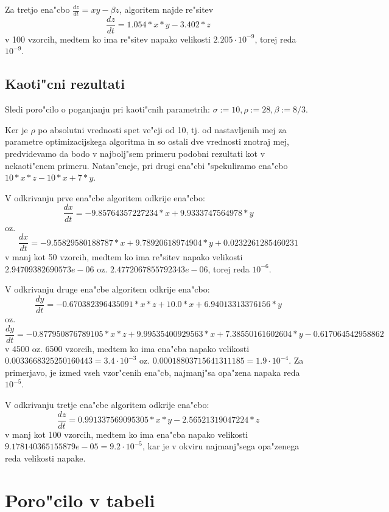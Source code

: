 \documentclass[10pt,a4paper]{article}
\begin{document}
Za tretjo ena"cbo 
$\frac{dz}{dt} = xy - \beta z$,
 algoritem najde re"sitev 
 $$\frac{dz}{dt} = 1.054*x*y - 3.402*z$$
v 100 vzorcih, medtem ko ima re"sitev napako velikosti 
$2.205\cdot 10^{-9}$, torej reda $10^{-9}$.

\subsection{Kaoti"cni rezultati}

Sledi poro"cilo o poganjanju pri kaoti"cnih parametrih:
$\sigma:=10, \rho:=28, \beta:=8/3$.

Ker je $\rho$ po absolutni vrednosti spet ve"cji od 10, tj. od nastavljenih 
mej za parametre optimizacijskega algoritma in so ostali dve vrednosti 
znotraj mej, predvidevamo da bodo v najbolj"sem primeru podobni rezultati kot 
v nekaoti"cnem primeru. Natan"cneje, pri drugi ena"cbi "spekuliramo
ena"cbo $10*x*z -10*x +7*y$.

V odkrivanju prve ena"cbe algoritem odkrije ena"cbo: 
$$\frac{dx}{dt} = -9.85764357227234*x + 9.9333747564978*y$$  
oz. $$\frac{dx}{dt} = -9.55829580188787*x + 9.78920618974904*y + 0.0232261285460231$$
v manj kot 50 vzorcih, medtem ko ima re"sitev napako velikosti
$2.94709382690573e-06$ oz. $2.4772067855792343e-06$, torej reda $10^{-6}$.

V odkrivanju druge ena"cbe algoritem odkrije ena"cbo:
$$ \frac{dy}{dt} = -0.670382396435091*x*z + 10.0*x + 6.94013313376156*y $$
oz. $$ \frac{dy}{dt} = -0.877950876789105*x*z + 9.99535400929563*x 
+ 7.38550161602604*y - 0.617064542958862 $$ 
v 4500 oz. 6500 vzorcih, medtem ko ima ena"cba napako velikosti
$0.0033668325250160443 = 3.4\cdot 10^ {-3}$ oz. $0.00018803715641311185 = 1.9\cdot 10^ {-4}$.
Za primerjavo, je izmed vseh vzor"cenih ena"cb, najmanj"sa opa"zena napaka
reda $10^ {-5}$.

V odkrivanju tretje ena"cbe algoritem odkrije ena"cbo: 
$$\frac{dz}{dt} = 0.991337569095305*x*y - 2.56521319047224*z$$ 
v manj kot 100 vzorcih, medtem ko ima ena"cba napako velikosti
$9.178140365155879e-05 = 9.2\cdot 10^ {-5}$,
kar je v okviru najmanj"sega opa"zenega reda velikosti napake.

\pagebreak
\section{Poro"cilo v tabeli}
\end{document}
